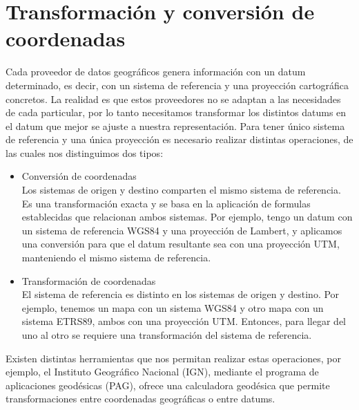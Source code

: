 \section{Transformación y conversión de coordenadas}
Cada proveedor de datos geográficos genera información con un datum determinado, es decir, con un sistema de referencia y una proyección cartográfica concretos.
La realidad es que estos proveedores no se adaptan a las necesidades de cada particular,
por lo tanto necesitamos transformar los distintos datums en el datum que mejor se ajuste a nuestra representación.
Para tener único sistema de referencia y una única proyección es necesario realizar distintas operaciones, de las cuales nos distinguimos dos tipos:
\begin{itemize}
  \item Conversión de coordenadas\\
  Los sistemas de origen y destino comparten el mismo sistema de referencia.  
  Es una transformación exacta y se basa en la aplicación de formulas establecidas que relacionan ambos sistemas.
  Por ejemplo, tengo un datum con un sistema de referencia WGS84 y una proyección de Lambert, 
  y aplicamos una conversión para que el datum resultante sea con una proyección UTM, manteniendo el mismo sistema de referencia. 
  \item Transformación de coordenadas\\
  El sistema de referencia es distinto en los sistemas de origen y destino. 
  Por ejemplo, tenemos un mapa con un sistema WGS84 y otro mapa con un sistema ETRS89, ambos con una proyección UTM.
  Entonces, para llegar del uno al otro se requiere una transformación del sistema de referencia.
\end{itemize}

Existen distintas herramientas que nos permitan realizar estas operaciones, por ejemplo, el Instituto Geográfico Nacional (IGN), mediante el programa de aplicaciones geodésicas (PAG),
ofrece una calculadora geodésica que permite transformaciones entre coordenadas geográficas o entre datums.





